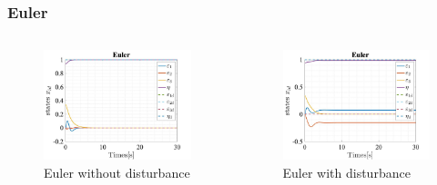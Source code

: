 \documentclass{beamer}
\begin{document}
\begin{frame}
    \frametitle{Euler}

    \begin{columns}

        \begin{figure}[h]
            \centering
            \includegraphics[width=1\textwidth]{Euler_T_LQR.jpg}
            \caption{Euler without disturbance}
        \end{figure}

        \begin{figure}[h]
            \centering
            \includegraphics[width=1\textwidth]{Euler_T_LQR_Dist.jpg}
            \caption{Euler with disturbance}
        \end{figure}
    \end{columns}
\end{frame}
\end{document}
